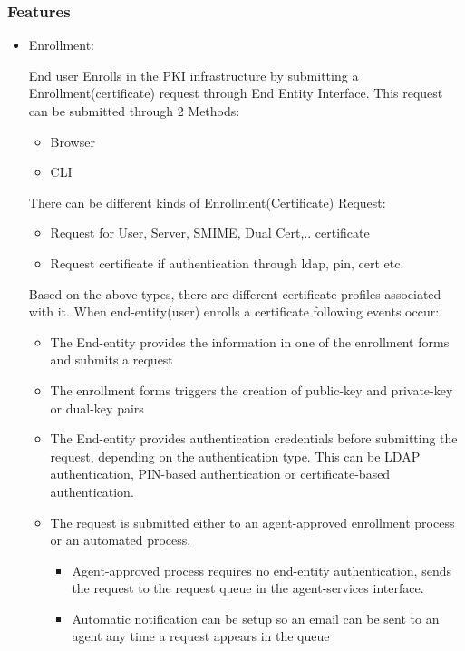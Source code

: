\documentclass[12pt]{report}
\begin{document}
\subsubsection{Features}
    \begin{itemize}
        \item Enrollment:

            End user Enrolls in the PKI infrastructure by submitting a Enrollment(certificate) request through End Entity Interface.
            This request can be submitted through 2 Methods:
            \begin{itemize}
                \item Browser
                \item CLI
            \end{itemize}
            There can be different kinds of Enrollment(Certificate) Request:
            \begin{itemize}
                \item Request for User, Server, SMIME, Dual Cert,.. certificate
                \item Request certificate if authentication through ldap, pin, cert etc. 
            \end{itemize}
            Based on the above types, there are different certificate profiles associated with it. 
            When end-entity(user) enrolls a certificate following events occur:
            \begin{itemize}
                \item The End-entity provides the information in one of the enrollment forms and submits a request
                \item The enrollment forms triggers the creation of public-key and private-key or dual-key pairs
                \item The End-entity provides authentication credentials before submitting the request,
                     depending on the authentication type. This can be LDAP authentication, PIN-based authentication or certificate-based authentication.
                \item The request is submitted either to an agent-approved enrollment process or an automated process.
                    \begin{itemize}
                        \item Agent-approved process requires no end-entity authentication, sends the request to the request queue in the agent-services interface.
                        \item Automatic notification can be setup so an email can be sent to an agent any time a request appears in the queue

\end{itemize}
\end{itemize}
\end{itemize}
\end{document}

